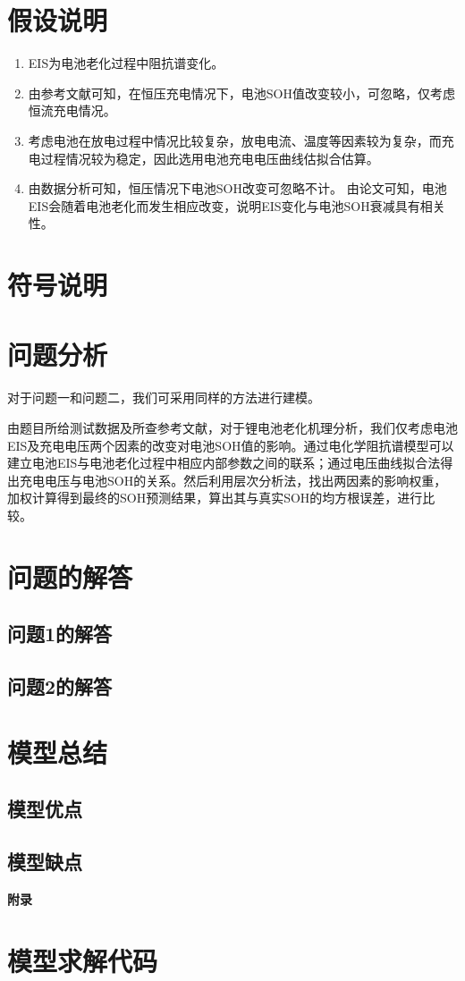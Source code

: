 \documentclass{cumcm}
\begin{document}
\section{假设说明}
\begin{enumerate}
\item EIS为电池老化过程中阻抗谱变化。
\item 由参考文献可知，在恒压充电情况下，电池SOH值改变较小，可忽略，仅考虑恒流充电情况。
\item 考虑电池在放电过程中情况比较复杂，放电电流、温度等因素较为复杂，而充电过程情况较为稳定，因此选用电池充电电压曲线估拟合估算。
\item 由数据分析可知，恒压情况下电池SOH改变可忽略不计。
 由论文可知，电池EIS会随着电池老化而发生相应改变，说明EIS变化与电池SOH衰减具有相关性。
\end{enumerate}
\section{符号说明}

\section{问题分析}
对于问题一和问题二，我们可采用同样的方法进行建模。\par
由题目所给测试数据及所查参考文献，对于锂电池老化机理分析，我们仅考虑电池EIS及充电电压两个因素的改变对电池SOH值的影响。通过电化学阻抗谱模型可以建立电池EIS与电池老化过程中相应内部参数之间的联系；通过电压曲线拟合法得出充电电压与电池SOH的关系。然后利用层次分析法，找出两因素的影响权重，加权计算得到最终的SOH预测结果，算出其与真实SOH的均方根误差，进行比较。


\section{问题的解答}
\subsection{问题1的解答}

\subsection{问题2的解答}


\section{模型总结}

\subsection{模型优点}

\subsection{模型缺点}





\newpage
\appendix
\textbf{附录}
\section{模型求解代码}
\end{document}
